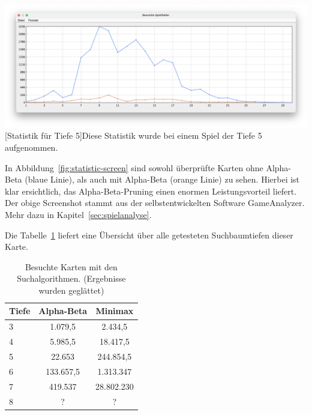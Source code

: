 \vspace{1em}
\begin{minipage}{\linewidth}
    \centering
    \includegraphics[width=0.9\linewidth]{statistic/Test-D5-01/ST-01-D5-LD}
    [Statistik für Tiefe 5]{Diese Statistik wurde bei einem Spiel der Tiefe 5 aufgenommen.}
    \label{fig:statistic-screen}
\end{minipage}
\vspace{1em}

In Abbildung~\ref{fig:statistic-screen} sind sowohl \"uberpr\"ufte Karten ohne Alpha-Beta (blaue Linie), als auch mit Alpha-Beta (orange Linie) zu sehen.
Hierbei ist klar ersichtlich, das Alpha-Beta-Pruning einen enormen Leistungsvorteil liefert.
Der obige Screenshot stammt aus der selbstentwickelten Software GameAnalyzer.
Mehr dazu in Kapitel~\ref{sec:spielanalyse}.

Die Tabelle~\ref{tab:search-depth} liefert eine \"Ubersicht \"uber alle getesteten Suchbaumtiefen dieser Karte.

\vspace{1em}
\begin{table}[!h]
    \centering
    \begin{tabular}{|l|c|c|}
        \hline
        \textbf{Tiefe} & \textbf{Alpha-Beta} & \textbf{Minimax}\\
        \hline
        3 & 1.079,5 & 2.434,5\\
        \hline
        4 & 5.985,5 & 18.417,5\\
        \hline
        5 & 22.653 & 244.854,5\\
        \hline
        6 & 133.657,5 & 1.313.347\\
        \hline
        7 & 419.537 & 28.802.230\\
        \hline
        8 & ? & ?\\
        \hline
    \end{tabular}
    \caption{Besuchte Karten mit den Suchalgorithmen. (Ergebnisse wurden geglättet)}
    \label{tab:search-depth}
\end{table}

